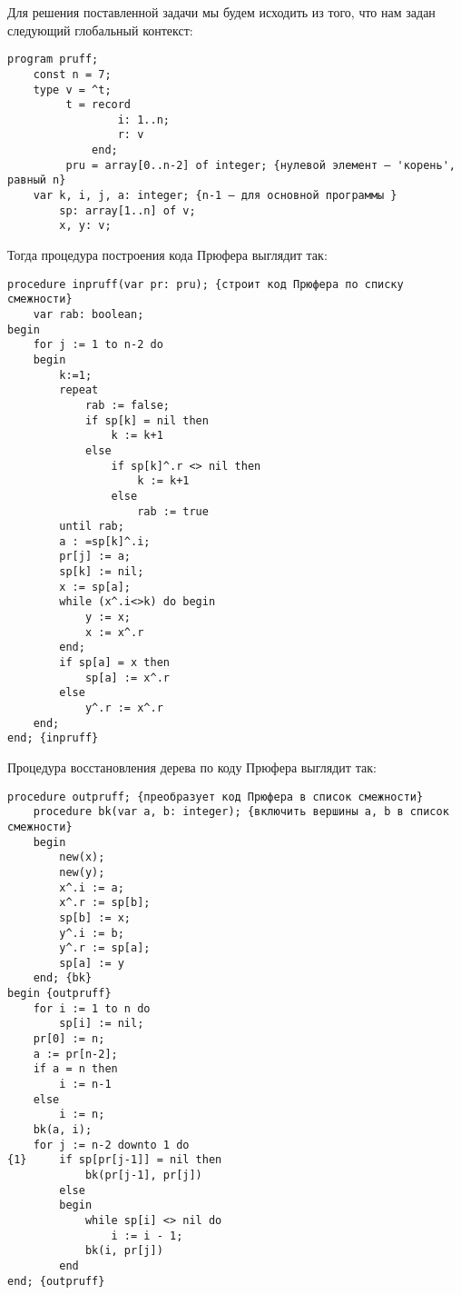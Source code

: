 \documentclass[12pt,a4paper]{article}
\theoremstyle{plain}
\theoremstyle{definition}
\theoremstyle{remark}
\newtheorem*{comment}{Комментарий}
\begin{document}
Для решения поставленной задачи мы будем исходить из того, что нам задан следующий глобальный контекст:

\begin{verbatim}
program pruff;
    const n = 7;
    type v = ^t;
         t = record
                 i: 1..n;
                 r: v
             end;
         pru = array[0..n-2] of integer; {нулевой элемент – 'корень', равный n}
    var k, i, j, a: integer; {n-1 – для основной программы }
        sp: array[1..n] of v;
        x, y: v;
\end{verbatim}

Тогда процедура построения кода Прюфера выглядит так:

\begin{verbatim}
procedure inpruff(var pr: pru); {строит код Прюфера по списку смежности}
    var rab: boolean;
begin
    for j := 1 to n-2 do
    begin
        k:=1;
        repeat
            rab := false;
            if sp[k] = nil then
                k := k+1
            else
                if sp[k]^.r <> nil then
                    k := k+1
                else
                    rab := true
        until rab;
        a : =sp[k]^.i;
        pr[j] := a;
        sp[k] := nil;
        x := sp[a];
        while (x^.i<>k) do begin
            y := x;
            x := x^.r
        end;
        if sp[a] = x then
            sp[a] := x^.r
        else
            y^.r := x^.r
    end;
end; {inpruff}
\end{verbatim}

Процедура восстановления дерева по коду Прюфера выглядит так:

\begin{verbatim}
procedure outpruff; {преобразует код Прюфера в список смежности}
    procedure bk(var a, b: integer); {включить вершины a, b в список смежности}
    begin
        new(x);
        new(y);
        x^.i := a;
        x^.r := sp[b];
        sp[b] := x;
        y^.i := b;
        y^.r := sp[a];
        sp[a] := y
    end; {bk}
begin {outpruff}
    for i := 1 to n do
        sp[i] := nil;
    pr[0] := n;
    a := pr[n-2];
    if a = n then
        i := n-1
    else
        i := n;
    bk(a, i);
    for j := n-2 downto 1 do
{1}     if sp[pr[j-1]] = nil then
            bk(pr[j-1], pr[j])
        else
        begin
            while sp[i] <> nil do
                i := i - 1;
            bk(i, pr[j])
        end
end; {outpruff}
\end{verbatim}

\begin{comment}
Нулевой элемент в описании типа \verb@pru@ введен для корректного вычисления, в случае $j=1$, логического выражения в условии оператора \verb@{1}@. В массиве \verb@pr@, используемого процедурой \verb@outpruff@ в качестве значения кода Прюфера, нулевому элементу присвоено значение равное $n$.
\end{comment}
\end{document}
